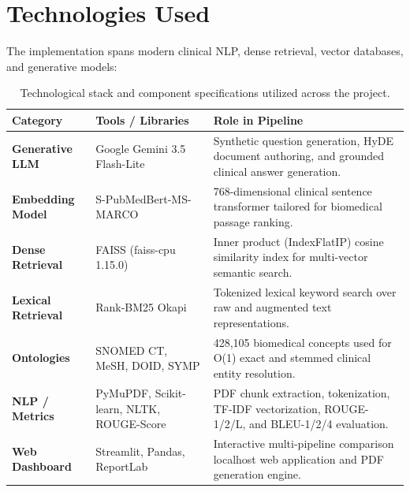 \documentclass[11pt,a4paper]{article}
\begin{document}
\section{Technologies Used}
The implementation spans modern clinical NLP, dense retrieval, vector databases, and generative models:
\begin{table}[h!]
\centering
\small
\renewcommand{\arraystretch}{1.15}
\begin{tabularx}{\textwidth}{l p{4.2cm} X}
\toprule
\textbf{Category} & \textbf{Tools / Libraries} & \textbf{Role in Pipeline} \\
\midrule
\textbf{Generative LLM} & Google Gemini 3.5 Flash-Lite & Synthetic question generation, HyDE document authoring, and grounded clinical answer generation. \\
\textbf{Embedding Model} & S-PubMedBert-MS-MARCO & 768-dimensional clinical sentence transformer tailored for biomedical passage ranking. \\
\textbf{Dense Retrieval} & FAISS (faiss-cpu 1.15.0) & Inner product (IndexFlatIP) cosine similarity index for multi-vector semantic search. \\
\textbf{Lexical Retrieval} & Rank-BM25 Okapi & Tokenized lexical keyword search over raw and augmented text representations. \\
\textbf{Ontologies} & SNOMED CT, MeSH, DOID, SYMP & 428,105 biomedical concepts used for O(1) exact and stemmed clinical entity resolution. \\
\textbf{NLP / Metrics} & PyMuPDF, Scikit-learn, NLTK, ROUGE-Score & PDF chunk extraction, tokenization, TF-IDF vectorization, ROUGE-1/2/L, and BLEU-1/2/4 evaluation. \\
\textbf{Web Dashboard} & Streamlit, Pandas, ReportLab & Interactive multi-pipeline comparison localhost web application and PDF generation engine. \\
\bottomrule
\end{tabularx}
\caption{Technological stack and component specifications utilized across the project.}
\end{table}

\end{document}
